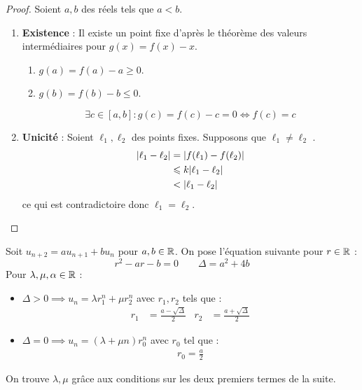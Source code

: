 \begin{proof}
	Soient $a, b$ des réels tels que $a < b$.
	\begin{enumerate}
		\item \textbf{Existence} : Il existe un point fixe d'après le théorème des valeurs intermédiaires pour $g(x) = f(x) - x$.
		\begin{enumerate}
			\item $g(a) = f(a) - a \geq 0$.
			\item $g(b) = f(b) - b \leq 0$.
		\end{enumerate}
		\[ \exists c \in [a, b] : g(c) = f(c) - c = 0 \iff f(c) = c \]
		\item \textbf{Unicité} : Soient $\ell_1, \ell_2$ des points fixes.
		Supposons que $\ell_1 \neq \ell_2$ .
		\begin{align*}
			\abs{\ell_1 - \ell_2} &= \abs{f(\ell_1) - f(\ell_2)} \\
								  &\leqslant k \abs{\ell_1 - \ell_2} \\
								  &< \abs{\ell_1 - \ell_2}
		\end{align*}
		ce qui est contradictoire donc $\ell_1 = \ell_2$.
	\end{enumerate}
\end{proof}

\begin{theorem}
	Soit $u_{n+2} = a u_{n+1} + b u_n$ pour $a, b \in \mathbb{R}$.
	On pose l'équation suivante pour $r \in \mathbb{R}$ :
	\[ r^2 - ar - b = 0 \qquad \Delta = a^2 + 4b \]
	Pour $\lambda, \mu, \alpha \in \mathbb{R}$ :
	\begin{itemize}
        \item $\Delta > 0 \implies u_n = \lambda r_1^n + \mu r_2^n$ avec $r_1, r_2$ tels que :
        \begin{align*}
            r_1 &= \frac{a - \sqrt{\Delta}}{2} & r_2 &= \frac{a + \sqrt{\Delta}}{2}
        \end{align*}
        \item $\Delta = 0 \implies u_n = (\lambda + \mu n) r_0^n$ avec $r_0$ tel que :
        \begin{align*}
            r_0 = \frac{a}{2}
        \end{align*}
    \end{itemize}    
    On trouve $\lambda, \mu$ grâce aux conditions sur les deux premiers termes de la suite.
\end{theorem}

